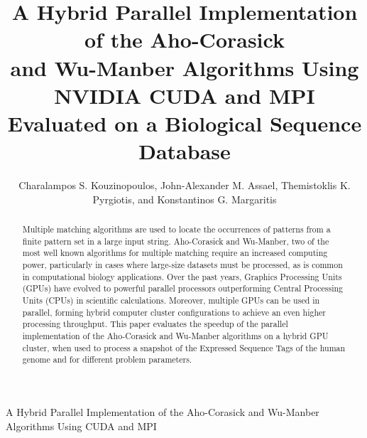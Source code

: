 \documentclass{ws-ijait}
\begin{document}
{A Hybrid Parallel Implementation of the Aho-Corasick and Wu-Manber Algorithms Using CUDA and MPI}

\catchline{}{}{}{}{}


\title{A Hybrid Parallel Implementation of the Aho-Corasick\\
and Wu-Manber Algorithms Using NVIDIA CUDA and MPI\\
Evaluated on a Biological Sequence Database}

\author{Charalampos S. Kouzinopoulos, John-Alexander M. Assael, Themistoklis K. Pyrgiotis, and
Konstantinos G. Margaritis}

\address{Parallel and Distributed Processing Laboratory\\
Department of Applied Informatics, University of Macedonia\\
156 Egnatia str., P.O. Box 1591, 54006 Thessaloniki, Greece\\
charalampos.kouzinopoulos@cern.ch, john.assael@wolfson.ox.ac.uk, t.pirgiot@gmail.com, kmarg@uom.gr}


\maketitle

\begin{history}
\end{history}

\begin{abstract}Multiple matching algorithms are used to locate the occurrences of patterns from a finite pattern set in a large input string. Aho-Corasick and Wu-Manber, two of the most well known algorithms for multiple matching require an increased computing power, particularly in cases where large-size datasets must be processed, as is common in computational biology applications. Over the past years, Graphics Processing Units (GPUs) have evolved to powerful parallel processors outperforming Central Processing Units (CPUs) in scientific calculations. Moreover, multiple GPUs can be used in parallel, forming hybrid computer cluster configurations to achieve an even higher processing throughput. This paper evaluates the speedup of the parallel implementation of the Aho-Corasick and Wu-Manber algorithms on a hybrid GPU cluster, when used to process a snapshot of the Expressed Sequence Tags of the human genome and for different problem parameters.\end{abstract}
\end{document}
